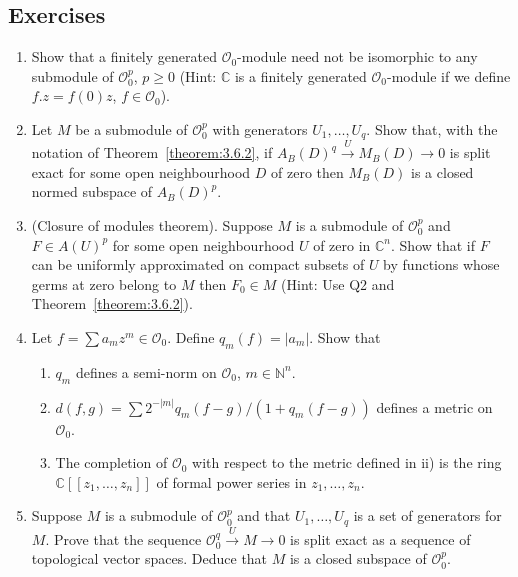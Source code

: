 \subsection*{Exercises}
\begin{enumerate}
\item Show that a finitely generated $\mathcal O_0$-module need not be isomorphic to any submodule of $\mathcal O_0^p$, $p\geq0$ (Hint: $\mathbb C$ is a finitely generated $\mathcal O_0$-module if we define $f.z=f(0)z$, $f\in\mathcal O_0$).
\item Let $M$ be a submodule of $\mathcal O_0^p$ with generators $U_1,\ldots,U_q$. Show that, with the notation of Theorem~\ref{theorem:3.6.2}, if $A_B(D)^q\xrightarrow{U}M_B(D)\to0$ is split exact for some open neighbourhood $D$ of zero then $M_B(D)$ is a closed normed subspace of $A_B(D)^p$.
\item (Closure of modules theorem). Suppose $M$ is a submodule of $\mathcal O_0^p$ and $F\in A(U)^p$ for some open neighbourhood $U$ of zero in $\mathbb C^n$. Show that if $F$ can be uniformly approximated on compact subsets of $U$ by functions whose germs at zero belong to $M$ then $F_0\in M$ (Hint: Use Q2 and Theorem~\ref{theorem:3.6.2}).
\item Let $f=\sum a_mz^m\in\mathcal O_0$. Define $q_m(f)=|a_m|$. Show that
\begin{enumerate}
\item[i)] $q_m$ defines a semi-norm on $\mathcal O_0$, $m\in\mathbb N^n$.
\item[ii)] $d(f,g)=\sum2^{-|m|}q_m(f-g)/(1+q_m(f-g))$ defines a metric on $\mathcal O_0$.
\item[iii)] The completion of $\mathcal O_0$ with respect to the metric defined in ii) is the ring $\mathbb C[[z_1,\ldots,z_n]]$ of formal power series in $z_1,\ldots,z_n$.
\end{enumerate}
\item[$5^*$.] Suppose $M$ is a submodule of $\mathcal O_0^p$ and that $U_1,\ldots,U_q$ is a set of generators for $M$. Prove that the sequence $\mathcal O_0^q\xrightarrow{U}M\to0$ is split exact as a sequence of topological vector spaces. Deduce that $M$ is a closed subspace of $\mathcal O_0^p$.
\end{enumerate}
